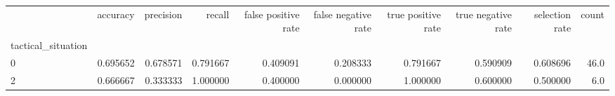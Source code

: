 \begin{tabular}{lrrrrrrrrr}
\toprule
{} &  accuracy &  precision &    recall &  false positive rate &  false negative rate &  true positive rate &  true negative rate &  selection rate &  count \\
tactical\_situation &           &            &           &                      &                      &                     &                     &                 &        \\
\midrule
0                  &  0.695652 &   0.678571 &  0.791667 &             0.409091 &             0.208333 &            0.791667 &            0.590909 &        0.608696 &   46.0 \\
2                  &  0.666667 &   0.333333 &  1.000000 &             0.400000 &             0.000000 &            1.000000 &            0.600000 &        0.500000 &    6.0 \\
\bottomrule
\end{tabular}
